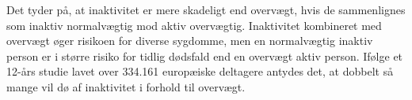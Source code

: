





Det tyder på, at inaktivitet er mere skadeligt end overvægt, hvis de sammenlignes som inaktiv normalvægtig mod aktiv overvægtig.
Inaktivitet kombineret med overvægt øger risikoen for diverse sygdomme, men en normalvægtig inaktiv person er i større risiko for tidlig dødsfald end en overvægt aktiv person. Ifølge et 12-års studie lavet over 334.161 europæiske deltagere antydes det, at dobbelt så mange vil dø af inaktivitet i forhold til overvægt. \citep{Ekelund2015} 

% 

